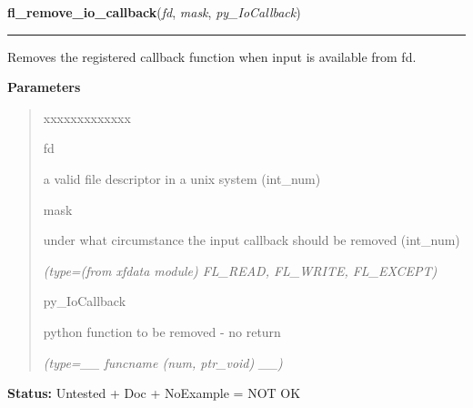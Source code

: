    \vspace{0.5ex}

\hspace{.8\funcindent}\begin{boxedminipage}{\funcwidth}

    \raggedright \textbf{fl\_remove\_io\_callback}(\textit{fd}, \textit{mask}, \textit{py\_IoCallback})

    \vspace{-1.5ex}

    \rule{\textwidth}{0.5\fboxrule}
\setlength{\parskip}{2ex}
    Removes the registered callback function when input is available from 
    fd.

\setlength{\parskip}{1ex}
      \textbf{Parameters}
      \vspace{-1ex}

      \begin{quote}
        \begin{Ventry}{xxxxxxxxxxxxx}

          \item[fd]

          a valid file descriptor in a unix system (int\_num)

          \item[mask]

          under what circumstance the input callback should be removed 
          (int\_num)

            {\it (type=(from xfdata module) FL\_READ, FL\_WRITE, FL\_EXCEPT)}

          \item[py\_IoCallback]

          python function to be removed - no return

            {\it (type=\_\_ funcname (num, ptr\_void) \_\_)}

        \end{Ventry}

      \end{quote}

\textbf{Status:} Untested + Doc + NoExample = NOT OK



    \end{boxedminipage}

    \label{xformslib:library:fl_add_signal_callback}

    \vspace{0.5ex}

